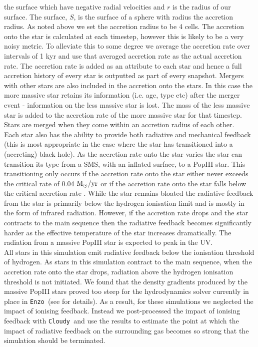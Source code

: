 \documentclass[graphics, twocolumn, usenatbib]{mn2e}
\newcommand{\enzo}{\texttt{Enzo~}}
\newcommand{\cloudy}{\texttt{Cloudy~}}
\newcommand{\msolaryr} {$\rm{M_{\odot}/yr}~$}
\begin{document}
the surface which have negative radial velocities and $r$ is the radius of our surface.
The surface, $S$, is the surface of a sphere with radius the accretion radius. As noted above we
set the accretion radius to be 4 cells. The accretion onto the star is calculated at each timestep,
however this is likely to be a very noisy metric. To alleviate this to some degree we average
the accretion rate over intervals of 1 kyr and use that averaged accretion rate as the actual
accretion rate. The accretion rate is added as an attribute to each star and hence a full
accretion history of every star is outputted as part of every snapshot. Mergers with other stars
are also included in the accretion onto the stars. In this case the more massive star retains its
information (i.e. age, type etc) after the merger event - information on the less massive star is
lost. The mass of the less massive star is added to the accretion rate of the more massive star for
that timestep. Stars are merged when they come within an accretion radius of each other.\\
\indent Each star also has the ability to provide both radiative and mechanical feedback (this is
most appropriate in the case where the star has transitioned into a (accreting) black hole). As the
accretion rate onto the star varies the star can transition its type from a SMS, with an inflated
surface, to a PopIII star. This transitioning only occurs if the accretion rate onto the star either
never exceeds the critical rate of 0.04 \msolaryr or if the accretion rate onto the star falls below
the critical accretion rate \citep{Sakurai_2016}. While the star remains bloated the radiative
feedback from the star is primarily below the hydrogen ionisation limit and is mostly in the
form of infrared radiation. However, if the accretion rate drops and the star contracts to the
main sequence then the radiative feedback becomes significantly harder as the effective
temperature of the star increases dramatically. The radiation from a massive PopIII star is expected
to peak in the UV. \\
\indent All stars in this simulation emit radiative feedback below the ionisation threshold of
hydrogen. As stars in this simulation contract to the main sequence, when the accretion rate onto the
star drops, radiation above the hydrogen ionisation threshold is not initiated. We found that the
density gradients produced by the massive PopIII stars proved too steep for the hydrodynamics solver
currently in place in \enzo (see \cite{Enzo_2014} for details). As a result, for these simulations
we neglected the impact of ionising feedback. Instead we post-processed the impact of
ionising feedback with \cloudy and use the results to estimate the point at which the impact of
radiative feedback on the surrounding gas becomes so strong that the simulation should be terminated.
\end{document}
